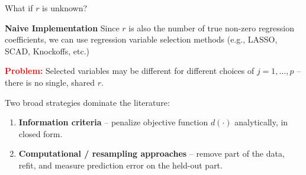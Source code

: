 \documentclass{beamer}
\newcommand{\bb}[1]{\boldsymbol{#1}}
\DeclareMathOperator*{\argmin}{arg\,min}
\begin{document}
\begin{frame}{What if $r$ is unknown?}

    \textbf{Naive Implementation}
    Since $r$ is also the number of true non-zero regression coefficients, we can use regression variable selection methods (e.g., LASSO, SCAD, Knockoffs, etc.)

    \pause
    \vspace*{1em}
    \textcolor{red}{\textbf{Problem:}} Selected variables may be different for different choices of $j = 1, \dots, p$ -- there is no single, shared $r$.

    \pause
    \vspace*{0.5em}
    \begin{center}
        \alert{Two broad strategies dominate the literature}:
    \end{center}
    \begin{enumerate}
        \item \textbf{Information criteria} -- penalize objective function $d(\cdot)$ analytically, in closed form.
        \item \textbf{Computational / resampling approaches} -- remove part of the data, refit, and measure prediction error on the held-out part.
    \end{enumerate}
\end{frame}


\end{document}
